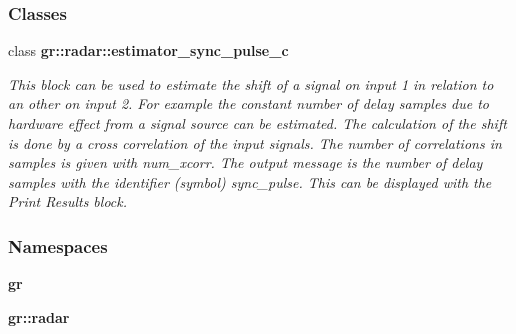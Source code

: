 \subsubsection*{Classes}
\begin{DoxyCompactItemize}
\item 
class {\bf gr\+::radar\+::estimator\+\_\+sync\+\_\+pulse\+\_\+c}
\begin{DoxyCompactList}\small\item\em This block can be used to estimate the shift of a signal on input 1 in relation to an other on input 2. For example the constant number of delay samples due to hardware effect from a signal source can be estimated. The calculation of the shift is done by a cross correlation of the input signals. The number of correlations in samples is given with num\+\_\+xcorr. The output message is the number of delay samples with the identifier (symbol) \textquotesingle{}sync\+\_\+pulse\textquotesingle{}. This can be displayed with the \textquotesingle{}Print Results\textquotesingle{} block. \end{DoxyCompactList}\end{DoxyCompactItemize}
\subsubsection*{Namespaces}
\begin{DoxyCompactItemize}
\item 
 {\bf gr}
\item 
 {\bf gr\+::radar}
\end{DoxyCompactItemize}
